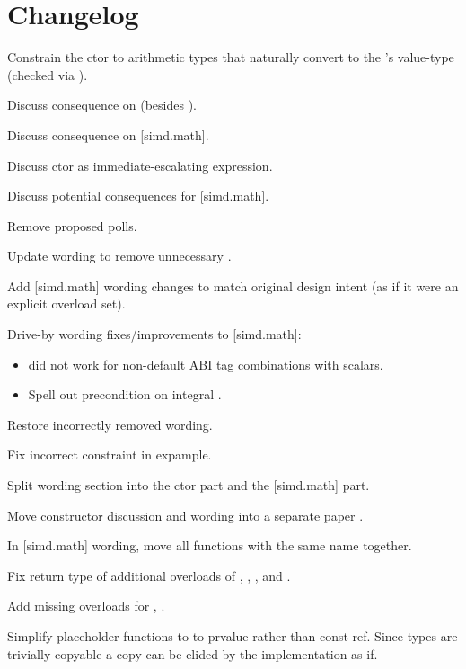 \section{Changelog}
\begin{revision}
\item Constrain the  ctor to arithmetic types that naturally
  convert to the 's value-type (checked via ).
\item Discuss consequence on  (besides ).
\item Discuss consequence on [simd.math].
\item Discuss  ctor as immediate-escalating expression.
\item Discuss potential consequences for [simd.math].
\end{revision}

\begin{revision}
\item Remove proposed polls.
\item Update wording to remove unnecessary .
\item Add [simd.math] wording changes to match original design intent (as if it
  were an explicit overload set).
\item Drive-by wording fixes/improvements to [simd.math]:
  \begin{itemize}
    \item {} did not work for non-default ABI
      tag combinations with scalars.
    \item Spell out precondition on integral .
  \end{itemize}
\end{revision}

\begin{revision}
\item Restore incorrectly removed  wording.
\item Fix incorrect constraint in  expample.
\item Split wording section into the  ctor part and the [simd.math] part.
\end{revision}

\begin{revision}
\item Move  constructor discussion and wording into a separate paper \parencite{P4012R0}.
\item In [simd.math] wording, move all functions with the same name together.
\item Fix return type of additional overloads of ,
  , , and .
\item Add missing overloads for , .
\item Simplify placeholder functions to  to prvalue rather than const-ref.
  Since  types are trivially copyable a copy can be elided by
  the implementation as-if.
\end{revision}
